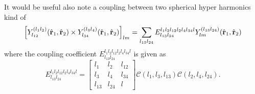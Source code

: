 It would be useful also note a coupling between two spherical hyper harmonics kind of
\begin{equation}
\left[ Y^{(l_1l_2)}_{l_{12}}(\hat{{\bf r}}_1,\hat{{\bf r}}_2) \times Y^{(l_3l_4)}_{l_{34}}(\hat{{\bf r}}_1,\hat{{ \bf r}}_2) \right]_{lm}= \sum_{l_{13}l_{24}} {E}^{l_1l_2l_{12}l_2l_4l_{34}l}_{l_{13}l_{24}}  Y^{(l_{13}l_{24})}_{lm}(\hat{{\bf r}}_1,\hat{{\bf r}}_2)
\end{equation}
where the coupling coefficient ${E}^{l_1l_2l_{12}l_2l_4l_{34}l}_{l_{13}l_{24}}$ is given as
\begin{equation}
\label{hyperSphTrans}
{E}^{l_1l_2l_{12}l_2l_4l_{34}l}_{l_{13}l_{24}} = 
\begin{bmatrix}
l_1 & l_2 & l_{12} \\ 
l_3 & l_4 & l_{34} \\ 
l_{13} & l_{24} & l
\end{bmatrix}
\mathcal{C}(l_1,l_3,l_{13})\mathcal{C}(l_2,l_4,l_{24}).
\end{equation}